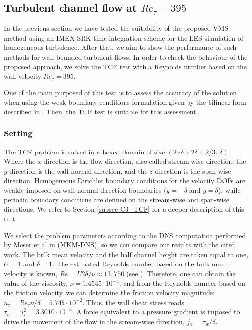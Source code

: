 \subsection{Turbulent channel flow at $Re_\tau=395$}
\label{subsec-C7_TCF}
In the previous section we have tested the suitability of the proposed VMS method using an IMEX SRK time integration scheme for the LES simulation of homogeneous turbulence. After that, we aim to show the performance of such methods for wall-bounded turbulent flows. In order to check the behaviour of the proposed approach, we solve the TCF test with a Reynolds number based on the wall velocity $ Re_\tau=395 $.

One of the main purposed of this test is to assess the accuracy of the solution when using the weak boundary conditions formulation given by the bilinear form described in . Then, the TCF test is suitable for this assessment.

\subsubsection{Setting}
The TCF problem is solved in a boxed domain of size $(2\pi\delta\times 2\delta\times 2/3\pi\delta)$. Where the $x$-direction is the flow direction, also called stream-wise direction, the $y$-direction is the wall-normal direction, and the $z$-direction is the span-wise direction. Homogeneous Dirichlet boundary conditions for the velocity DOFs are weakly imposed on wall-normal direction boundaries ($y=-\delta$ and $y=\delta$), while periodic boundary conditions are defined on the stream-wise and span-wise directions. We refer to Section \ref{subsec-C3_TCF} for a deeper description of this test.

We select the problem parameters according to the DNS computation performed by Moser et al in \cite{moser_direct_1999,kim_turbulence_1987} (MKM-DNS), so we can compare our results with the cited work. The bulk mean velocity and the half channel height are taken equal to one, $\bar{U}=1$ and $\delta=1$. The estimated Reynolds number based on the bulk mean velocity is known, $Re=\bar{U}2\delta/\nu\approx 13,750$ (see \cite{pope_turbulent_2000}). Therefore, one can obtain the value of the viscosity, $\nu=1.4545\cdot10^{-4}$, and from the Reynolds number based on the friction velocity, we can determine the friction velocity magnitude: $u_\tau=Re_\tau\nu/\delta=5.745\cdot10^{-2}$. Thus, the wall shear stress reads $\tau_w=u_\tau^2=3.3010\cdot10^{-3}$. A force equivalent to a pressure gradient is imposed to drive the movement of the flow in the stream-wise direction, $f_x=\tau_w/\delta$.

